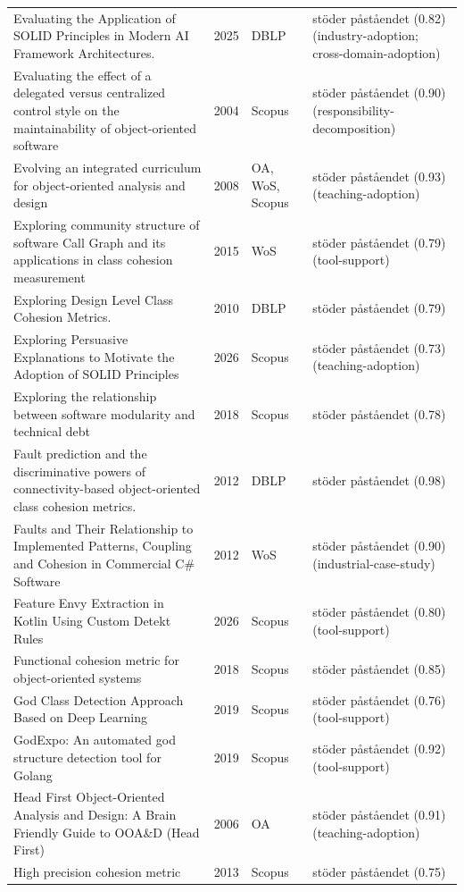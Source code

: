 \begin{longtable}{@{}%
  >{\raggedright\arraybackslash}p{}c%
  >{\raggedright\arraybackslash}p{}%
  >{\raggedright\arraybackslash}p{}@{}}
Evaluating the Application of SOLID Principles in Modern AI Framework Architectures. & 2025 & DBLP & stöder påståendet (0.82) (industry-adoption; cross-domain-adoption) \\
Evaluating the effect of a delegated versus centralized control style on the maintainability of object-oriented software & 2004 & Scopus & stöder påståendet (0.90) (responsibility-decomposition) \\
Evolving an integrated curriculum for object-oriented analysis and design & 2008 & OA, WoS, Scopus & stöder påståendet (0.93) (teaching-adoption) \\
Exploring community structure of software Call Graph and its applications in class cohesion measurement & 2015 & WoS & stöder påståendet (0.79) (tool-support) \\
Exploring Design Level Class Cohesion Metrics. & 2010 & DBLP & stöder påståendet (0.79) \\
Exploring Persuasive Explanations to Motivate the Adoption of SOLID Principles & 2026 & Scopus & stöder påståendet (0.73) (teaching-adoption) \\
Exploring the relationship between software modularity and technical debt & 2018 & Scopus & stöder påståendet (0.78) \\
Fault prediction and the discriminative powers of connectivity-based object-oriented class cohesion metrics. & 2012 & DBLP & stöder påståendet (0.98) \\
Faults and Their Relationship to Implemented Patterns, Coupling and Cohesion in Commercial C\# Software & 2012 & WoS & stöder påståendet (0.90) (industrial-case-study) \\
Feature Envy Extraction in Kotlin Using Custom Detekt Rules & 2026 & Scopus & stöder påståendet (0.80) (tool-support) \\
Functional cohesion metric for object-oriented systems & 2018 & Scopus & stöder påståendet (0.85) \\
God Class Detection Approach Based on Deep Learning & 2019 & Scopus & stöder påståendet (0.76) (tool-support) \\
GodExpo: An automated god structure detection tool for Golang & 2019 & Scopus & stöder påståendet (0.92) (tool-support) \\
Head First Object-Oriented Analysis and Design: A Brain Friendly Guide to OOA\&D (Head First) & 2006 & OA & stöder påståendet (0.91) (teaching-adoption) \\
High precision cohesion metric & 2013 & Scopus & stöder påståendet (0.75) \\

\end{longtable}
